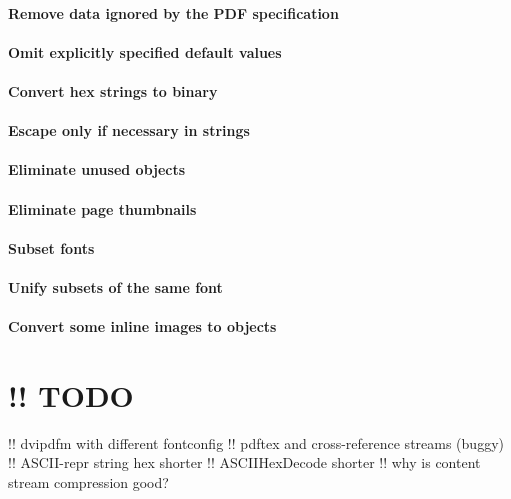 \documentclass{article}
\begin{document}
\paragraph{Remove data ignored by the PDF specification}

\paragraph{Omit explicitly specified default values}

\paragraph{Convert hex strings to binary}

\paragraph{Escape only if necessary in strings}

\paragraph{Eliminate unused objects}

\paragraph{Eliminate page thumbnails}

\paragraph{Subset fonts}

\paragraph{Unify subsets of the same font}

\paragraph{Convert some inline images to objects}


\section{!! TODO}

!! dvipdfm with different fontconfig
!! pdftex and cross-reference streams (buggy)
!! ASCII-repr string hex shorter
!! ASCIIHexDecode shorter
!! why is content stream compression good?
\end{document}
